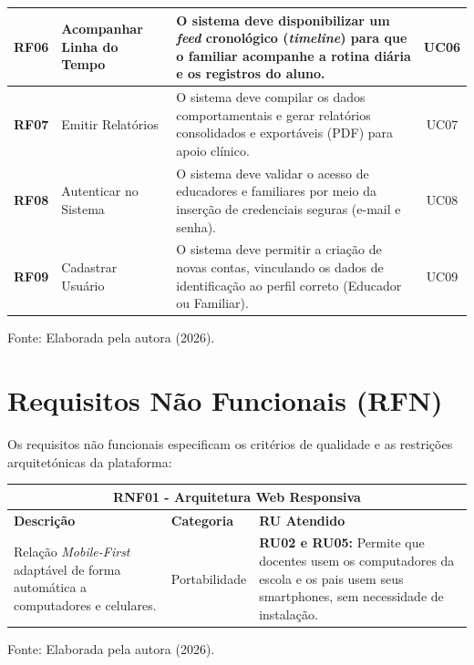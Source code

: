 \begin{quadro}[H]
\begin{tabular}{|c|p{4cm}|p{7.5cm}|c|}
        \textbf{RF06} & Acompanhar Linha do Tempo & O sistema deve disponibilizar um \textit{feed} cronológico (\textit{timeline}) para que o familiar acompanhe a rotina diária e os registros do aluno. & UC06 \\ \hline
        
        \textbf{RF07} & Emitir Relatórios & O sistema deve compilar os dados comportamentais e gerar relatórios consolidados e exportáveis (PDF) para apoio clínico. & UC07 \\ \hline
        
        \textbf{RF08} & Autenticar no Sistema & O sistema deve validar o acesso de educadores e familiares por meio da inserção de credenciais seguras (e-mail e senha). & UC08 \\ \hline
        
        \textbf{RF09} & Cadastrar Usuário & O sistema deve permitir a criação de novas contas, vinculando os dados de identificação ao perfil correto (Educador ou Familiar). & UC09 \\ \hline
    \end{tabular}
    
    \vspace{0.1cm}
    \begin{flushleft}
        \footnotesize Fonte: Elaborada pela autora (2026).
    \end{flushleft}
\end{quadro}

\vspace{0.1cm}
\section{Requisitos Não Funcionais (RFN)}

Os requisitos não funcionais especificam os critérios de qualidade e as restrições arquitetónicas da plataforma:

\begin{quadro}[H]
    \centering
    \caption{RNF01: Arquitetura Web Responsiva}
    \label{quadro:rnf01}
    \renewcommand{\arraystretch}{1.5}
    \begin{tabular}{|p{5.5cm}|p{2.5cm}|p{7cm}|}
        \hline
        \multicolumn{3}{|c|}{\textbf{RNF01 - Arquitetura Web Responsiva}} \\ \hline
        \textbf{Descrição} & \textbf{Categoria} & \textbf{RU Atendido} \\ \hline
        Relação \textit{Mobile-First} adaptável de forma automática a computadores e celulares. & Portabilidade & \textbf{RU02 e RU05:} Permite que docentes usem os computadores da escola e os pais usem seus smartphones, sem necessidade de instalação. \\ \hline
    \end{tabular}
    
    \vspace{0.1cm}
    \begin{flushleft}
        \footnotesize Fonte: Elaborada pela autora (2026).
    \end{flushleft}
\end{quadro}

